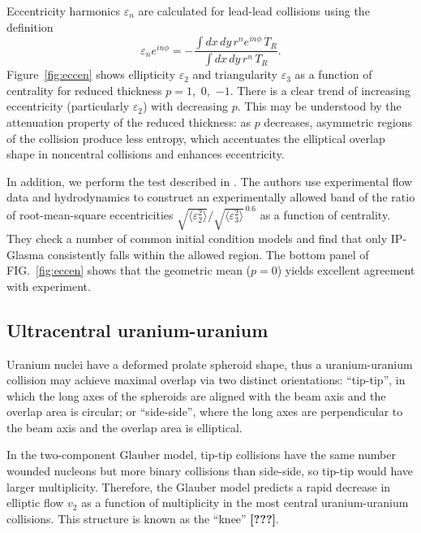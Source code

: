 \documentclass[aps,prl,reprint,amsmath,nofootinbib]{revtex4-1}
\newcommand{\needcite}{\textbf{[???]}}
\begin{document}
Eccentricity harmonics $\varepsilon_n$ are calculated for lead-lead collisions using the definition
\begin{equation}
  \varepsilon_n e^{i n\phi} = -\frac{\int dx \, dy\, r^n e^{i n \phi} \, T_R}{\int dx \, dy \, r^n \, T_R}.
\end{equation}
Figure~\ref{fig:eccen} shows ellipticity $\varepsilon_2$ and triangularity $\varepsilon_3$ as a function of
centrality for reduced thickness $p = 1$,~0,~$-1$.  There is a clear trend of increasing eccentricity
(particularly $\varepsilon_2$) with decreasing $p$.  This may be understood by the attenuation property of the
reduced thickness:  as $p$ decreases, asymmetric regions of the collision produce less entropy, which
accentuates the elliptical overlap shape in noncentral collisions and enhances eccentricity.

In addition, we perform the test described in \cite{constraining-ic}.  The authors use experimental flow data
and hydrodynamics to construct an experimentally allowed band of the ratio of root-mean-square eccentricities
$\sqrt{\langle \varepsilon_2^2 \rangle}/\sqrt{\langle \varepsilon_3^2 \rangle}^{\,0.6}$ as a function of
centrality.  They check a number of common initial condition models and find that only IP-Glasma consistently
falls within the allowed region.  The bottom panel of FIG.~\ref{fig:eccen} shows that the geometric mean
($p = 0$) yields excellent agreement with experiment.

\subsection{Ultracentral uranium-uranium}

Uranium nuclei have a deformed prolate spheroid shape, thus a uranium-uranium collision may achieve maximal
overlap via two distinct orientations:  ``tip-tip'', in which the long axes of the spheroids are aligned with
the beam axis and the overlap area is circular; or ``side-side'', where the long axes are perpendicular to the
beam axis and the overlap area is elliptical.

In the two-component Glauber model, tip-tip collisions have the same number wounded nucleons but more binary
collisions than side-side, so tip-tip would have larger multiplicity.  Therefore, the Glauber model predicts a
rapid decrease in elliptic flow $v_2$ as a function of multiplicity in the most central uranium-uranium
collisions.  This structure is known as the ``knee'' \needcite.
\end{document}
